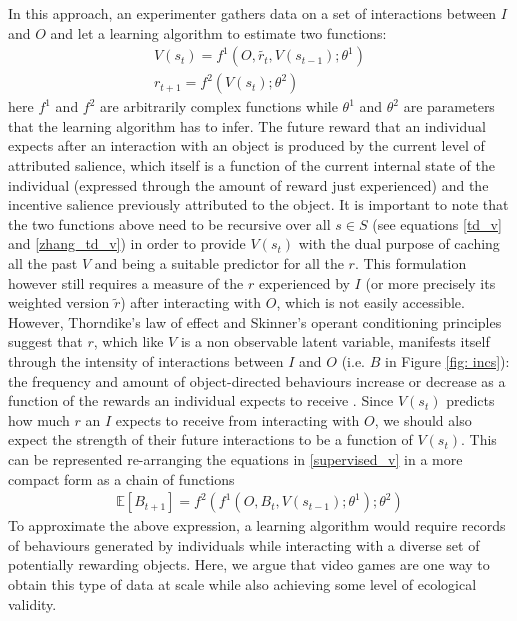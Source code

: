 In this approach, an experimenter gathers data on a set of interactions between $I$ and $O$ and let a learning algorithm to estimate two functions:
\begin{gather}
\label{supervised_v}
    V(s_{t}) = f^{1}(O, \tilde{r_{t}}, V(s_{t-1}); \theta^{1}) \\
    r_{t+1} = f^{2}(V(s_{t}); \theta^{2}) \nonumber
\end{gather}
here $f^{1}$ and $f^{2}$ are arbitrarily complex functions while $\theta^{1}$ and $\theta^{2}$ are parameters that the learning algorithm has to infer. The future reward that an individual expects after an interaction with an object is produced by the current level of attributed salience, which  itself is a function of the current internal state of the individual (expressed through the amount of reward just experienced) and the incentive salience previously attributed to the object. It is important to note that the two functions above need to be recursive over all $s \in S$ (see equations \ref{td_v} and \ref{zhang_td_v}) in order to provide $V(s_{t})$ with the dual purpose of caching all the past $V$ and being a suitable predictor for all the $r$. This formulation however still requires a measure of the $r$ experienced by $I$ (or more precisely its weighted version $\tilde{r}$) after interacting with $O$, which is not easily accessible. However, Thorndike's law of effect \cite{thorndike1927law} and Skinner's operant conditioning principles \cite{skinner1965science} suggest that $r$, which  like $V$ is a non observable latent variable, manifests itself through the intensity of interactions between $I$ and $O$ (i.e. $B$ in Figure \ref{fig: incs}): the frequency and amount of object-directed behaviours increase or decrease as a function of the rewards an individual expects to receive \cite{berridge2004motivation,schultz2017reward}. Since $V(s_{t})$ predicts how much $r$ an $I$ expects to receive from interacting with $O$, we should also expect the strength of their future interactions to be a function of $V(s_{t})$. This can be represented re-arranging the equations in \ref{supervised_v} in a more compact form as a chain of functions
\begin{align}
\label{supervised_b}
    \mathbb{E}[B_{t+1}] = f^{2}(f^{1}(O, B_{t}, V(s_{t-1}); \theta^{1});  \theta^{2})
\end{align}
To approximate the above expression, a learning algorithm would require records of behaviours generated by individuals while interacting with a diverse set of potentially rewarding objects. Here, we argue that video games are one way to obtain this type of data at scale while also achieving some level of ecological validity.

